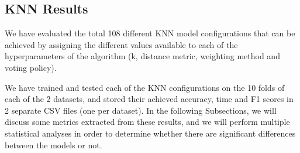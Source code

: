 \subsection{KNN Results}
We have evaluated the total 108 different KNN model configurations that can be achieved by assigning the different values available to each of the hyperparameters of the algorithm (k, distance metric, weighting method and voting policy).

We have trained and tested each of the KNN configurations on the 10 folds of each of the 2 datasets, and stored their achieved accuracy, time and F1 scores in 2 separate CSV files (one per dataset). In the following Subsections, we will discuss some metrics extracted from these results, and we will perform multiple statistical analyses in order to determine whether there are significant differences between the models or not.


